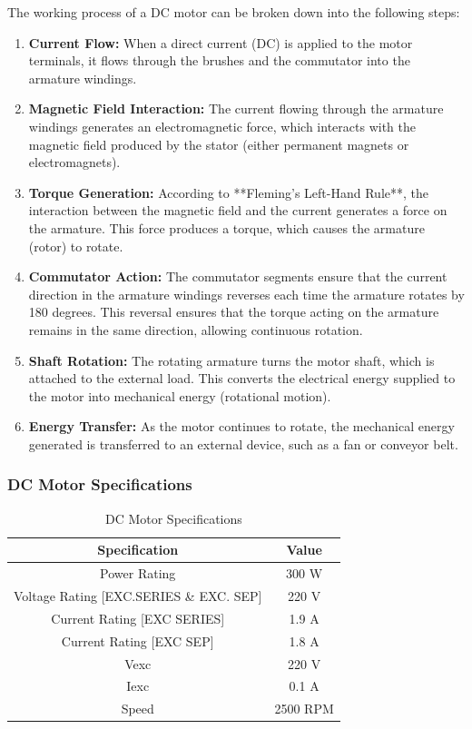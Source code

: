 \documentclass[a4paper,12pt]{article}
\begin{document}
	The working process of a DC motor can be broken down into the following steps:
	
	\begin{enumerate}
		\item \textbf{Current Flow:} When a direct current (DC) is applied to the motor terminals, it flows through the brushes and the commutator into the armature windings.
		
		\item \textbf{Magnetic Field Interaction:} The current flowing through the armature windings generates an electromagnetic force, which interacts with the magnetic field produced by the stator (either permanent magnets or electromagnets).
		
		\item \textbf{Torque Generation:} According to **Fleming’s Left-Hand Rule**, the interaction between the magnetic field and the current generates a force on the armature. This force produces a torque, which causes the armature (rotor) to rotate.
		
		\item \textbf{Commutator Action:} The commutator segments ensure that the current direction in the armature windings reverses each time the armature rotates by 180 degrees. This reversal ensures that the torque acting on the armature remains in the same direction, allowing continuous rotation.
		
		\item \textbf{Shaft Rotation:} The rotating armature turns the motor shaft, which is attached to the external load. This converts the electrical energy supplied to the motor into mechanical energy (rotational motion).
		
		\item \textbf{Energy Transfer:} As the motor continues to rotate, the mechanical energy generated is transferred to an external device, such as a fan or conveyor belt.
	\end{enumerate}
	

	\subsubsection{DC Motor Specifications}
	\begin{table}[H]
		\centering
		\caption{DC Motor Specifications}
		\begin{tabular}{| c | c |}
			\hline
			\textbf{Specification} & \textbf{Value} \\ \hline
			Power Rating & 300 W\\ \hline
			Voltage Rating [EXC.SERIES \& EXC. SEP] & 220 V \\ \hline
			Current Rating [EXC SERIES] & 1.9 A \\ \hline
			Current Rating [EXC SEP] & 1.8 A \\ \hline
			Vexc & 220 V \\ \hline
			Iexc & 0.1 A \\ \hline
			Speed & 2500 RPM \\ \hline
			
		\end{tabular}
		
		
		\label{tab:2}
	\end{table}
	
\end{document}
